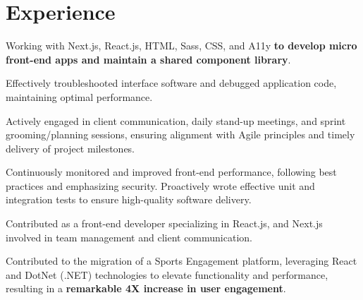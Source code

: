\documentclass[letterpaper]{deedy-resume} %
\begin{document}
\begin{minipage}[t]{0.66\textwidth} %


\section{Experience}


\vspace{\topsep} %
\begin{tightitemize}
\item Working with Next.js, React.js, HTML, Sass, CSS, and A11y \textbf{to develop micro front-end apps and maintain a shared component library}.
\item Effectively troubleshooted interface software and debugged application code, maintaining optimal performance.
\item Actively engaged in client communication, daily stand-up meetings, and sprint grooming/planning sessions, ensuring alignment with Agile principles and timely delivery of project milestones.
\item Continuously monitored and improved front-end performance, following best practices and emphasizing security. Proactively wrote effective unit and integration tests to ensure high-quality software delivery.

\end{tightitemize}

\sectionspace %


\begin{tightitemize}
\item Contributed as a front-end developer specializing in React.js, and Next.js involved in team management and client communication.
\item  Contributed to the migration of a Sports Engagement platform, leveraging React and DotNet (.NET) technologies to elevate functionality and performance,
resulting in a \textbf{remarkable 4X increase in user engagement}.
\end{tightitemize}


\end{minipage}
\end{document}

